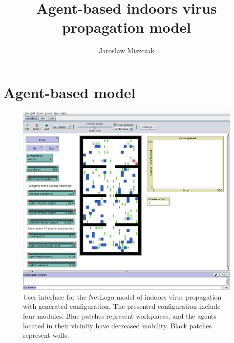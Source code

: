 \documentclass[11pt,a4paper]{article}
\title{Agent-based indoors virus propagation model}
\author{Jarosław Miszczak}
\begin{document}
\maketitle



\section{Agent-based model}

\begin{figure}[ht!]
\includegraphics[width=\textwidth]{plots/model-gui.png}
\caption{User interface for the NetLogo model of indoors virus propagation with generated configuration. The presented configuration include four modules. Blue patches represent workplaces, and the agents located in their vicinity have decreased mobility. Black patches represent walls.}
\label{fig:gui-world-3}
\end{figure}


\end{document}
